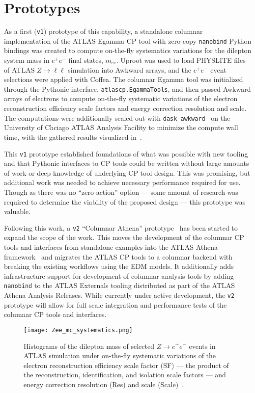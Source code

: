 \section{Prototypes}\label{sec:prototypes}

As a first (\texttt{v1}) prototype of this capability, a standalone columnar implementation of the ATLAS Egamma CP tool with zero-copy \texttt{nanobind} Python bindings was created to compute on-the-fly systematics variations for the dilepton system mass in $e^{+}e^{-}$ final states, $m_{ee}$.
Uproot was used to load PHYSLITE files of ATLAS $Z\to \ell\ell$ simulation into Awkward arrays, and the $e^{+}e^{-}$ event selections were applied with Coffea.
The columnar Egamma tool was initialized through the Pythonic interface, \texttt{atlascp.EgammaTools}, and then passed Awkward arrays of electrons to compute on-the-fly systematic variations of the electron reconstruction efficiency scale factors and energy correction resolution and scale.
The computations were additionally scaled out with \texttt{dask-awkward}~\cite{dask_awkward_2024} on the University of Chciago ATLAS Analysis Facility to minimize the compute wall time, with the gathered results visualized in~.

This \texttt{v1} prototype established foundations of what was possible with new tooling and that Pythonic interfaces to CP tools could be written without large amounts of work or deep knowledge of underlying CP tool design.
This was promising, but additional work was needed to achieve necessary performance required for use.
Though as there was no ``zero action'' option --- some amount of research was required to determine the viability of the proposed design --- this prototype was valuable.

Following this work, a \texttt{v2} ``Columnar Athena'' prototype~\cite{columnar_athena} has been started to expand the scope of the work.
This moves the development of the columnar CP tools and interfaces from standalone examples into the ATLAS Athena framework~\cite{ATLAS_Athena} and migrates the ATLAS CP tools to a columnar backend with breaking the existing workflows using the EDM models.
It additionally adds infrastructure support for development of columnar analysis tools by adding \texttt{nanobind} to the ATLAS Externals tooling distributed as part of the ATLAS Athena Analysis Releases.
While currently under active development, the \texttt{v2} prototype will allow for full scale integration and performance tests of the columnar CP tools and interfaces.

\begin{figure}
    \centering
    \texttt{[image: Zee\_mc\_systematics.png]}
    \caption{Histograms of the dilepton mass of selected $Z\to e^{+}e^{-}$ events in ATLAS simulation under on-the-fly systematic variations of the electron reconstruction efficiency scale factor (SF) --- the product of the reconstruction, identification, and isolation scale factors --- and energy correction resolution (Res) and scale (Scale)~\cite{Vigl:ACAT_2024}.}
    \label{fig:Zee_mc_systematics}
\end{figure}
